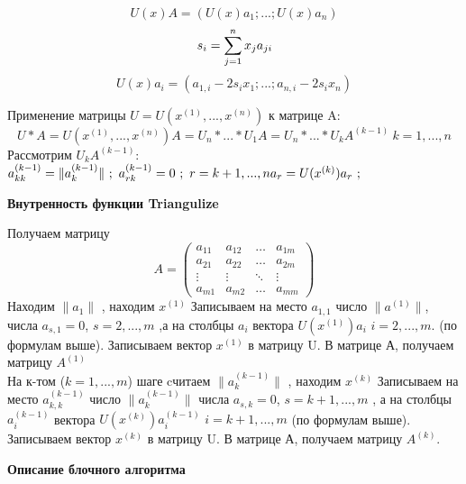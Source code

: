 \documentclass[a4paper,12pt]{article}
\begin{document}
\begin{equation}
    U(x)A = (U(x)a_{1};...; U(x)a_{n})
\end{equation}
\begin{equation}
     s_{i} = \sum\limits_{j = 1}^n {x_{j}}{a_{ji}}\\
\end{equation}
\begin{equation}
    U(x)a_{i} = (a_{1,i} - 2 s_{i} x_{1};...;a_{n,i} - 2 s_{i} x_{n})
\end{equation}

Применение матрицы $U = U(x^{(1)},...,x^{(n)})$ к матрице A:
\begin{equation}
    U*A = U(x^{(1)},...,x^{(n)})A = U_{n} *...* U_{1}A = U_{n} *...* U_{k}A^{(k-1)} \ k = 1,...,n
\end{equation}
Рассмотрим $U_{k}A^{(k-1)} $:
$
a_{kk}^{(k-1)} = \|a_{k}^{(k-1)}\| \ ; \ a_{rk}^{(k-1)} = 0 \ ; \ r = k+1,...,n \\
a_{r} = U(x^{(k)})a_{r}\ ;
$
\\
\begin{center}
{\bfseries Внутренность функции Triangulize}
\end{center} 
Получаем матрицу $$A=
   \begin{pmatrix}
     a_{11}& a_{12} &\ldots & a_{1m}\\
     a_{21}& a_{22} &\ldots & a_{2m}\\
     \vdots& \vdots &\ddots & \vdots\\
     a_{m1}& a_{m2} &\ldots & a_{mm}
    \end{pmatrix}
$$ 
Находим $\|a_{1}\|$ , находим $x^{(1)}$ Записываем на место $a_{1,1}$ число $\|a^{(1)}\|$, числа $a_{s,1} = 0$, $s = 2,..., m$ ,а на столбцы $a_{i}$ вектора $U(x^{(1)})a_{i}$ $i = 2,...,m $. (по формулам выше). Записываем вектор $x^{(1)}$ в матрицу U. В матрице А, получаем матрицу $A^{(1)}$\\

На к-том ($k = 1,...,m$) шаге cчитаем $\|a_{k}^{(k-1)}\|$ , находим $x^{(k)}$ Записываем на место $a_{k,k}^{(k-1)}$ число $\|a_{k}^{(k-1)} \|$ числа $a_{s,k} = 0$, $s = k+1,..., m$ , а на столбцы $a_{i}^{(k-1)}$ вектора $U(x^{(k)})a_{i}^{(k-1)}$ $i = k+1,...,m$ (по формулам выше). Записываем вектор $x^{(k)}$ в матрицу U. В матрице А, получаем матрицу $A^{(k)}.$
\begin{center}
{\bfseries Описание блочного алгоритма}
\end{center} 
\end{document}
